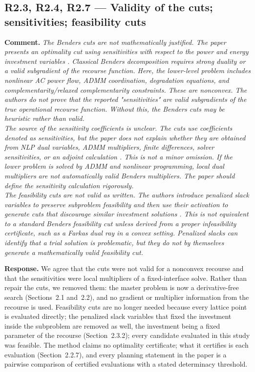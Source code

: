 \documentclass[11pt]{article}
\newcommand{\rcomment}[1]{\par\medskip\noindent\textbf{Comment.} \textit{#1}\par\smallskip}
\newcommand{\rresponse}[1]{\noindent\textbf{Response.} #1\par\smallskip}
\begin{document}
\subsection*{R2.3, R2.4, R2.7 --- Validity of the cuts; sensitivities; feasibility cuts}
\rcomment{
The Benders cuts are not mathematically justified. The paper presents an optimality cut using sensitivities with respect to the power and energy investment variables . Classical Benders decomposition requires strong duality or a valid subgradient of the recourse function. Here, the lower-level problem includes nonlinear AC power flow, ADMM coordination, degradation equations, and complementarity/relaxed complementarity constraints. These are nonconvex. The authors do not prove that the reported "sensitivities" are valid subgradients of the true operational recourse function. Without this, the Benders cuts may be heuristic rather than valid.\\
The source of the sensitivity coefficients is unclear. The cuts use coefficients denoted as sensitivities, but the paper does not explain whether they are obtained from NLP dual variables, ADMM multipliers, finite differences, solver sensitivities, or an adjoint calculation . This is not a minor omission. If the lower problem is solved by ADMM and nonlinear programming, local dual multipliers are not automatically valid Benders multipliers. The paper should define the sensitivity calculation rigorously.\\
The feasibility cuts are not valid as written. The authors introduce penalized slack variables to preserve subproblem feasibility and then use their activation to generate cuts that discourage similar investment solutions . This is not equivalent to a standard Benders feasibility cut unless derived from a proper infeasibility certificate, such as a Farkas dual ray in a convex setting. Penalized slacks can identify that a trial solution is problematic, but they do not by themselves generate a mathematically valid feasibility cut.
}
\rresponse{
    We agree that the cuts were not valid for a nonconvex recourse and that the sensitivities were local multipliers of a fixed-interface solve. Rather than repair the cuts, we removed them: the master problem is now a derivative-free search (Sections~2.1 and~2.2), and no gradient or multiplier information from the recourse is used. Feasibility cuts are no longer needed because every lattice point is evaluated directly; 
    the penalized slack variables that fixed the investment inside the subproblem are removed as well, the investment being a fixed parameter of the recourse (Section~2.3.2);
    every candidate evaluated in this study was feasible. The method claims no optimality certificate; what it certifies is each evaluation (Section~2.2.7), and every planning statement in the paper is a pairwise comparison of certified evaluations with a stated determinacy threshold.
}
\end{document}
